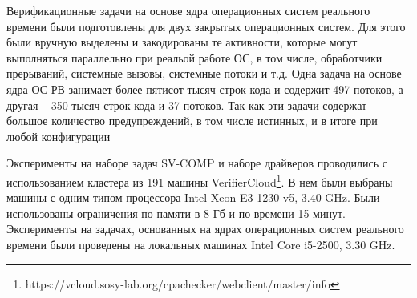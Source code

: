 Верификационные задачи на основе ядра операционных систем реального времени были подготовлены для двух закрытых операционных систем.
Для этого были вручную выделены и закодированы те активности, которые могут выполняться параллельно при реальой работе ОС, в том числе, обработчики прерываний, системные вызовы, системные потоки и т.д.
Одна задача на основе ядра ОС РВ занимает более пятисот тысяч строк кода и содержит 497 потоков, а другая -- 350 тысяч строк кода и 37 потоков.
Так как эти задачи содержат большое количество предупреждений, в том числе истинных, и в итоге при любой конфигурации

Эксперименты на наборе задач SV-COMP и наборе драйверов проводились с использованием кластера из 191 машины VerifierCloud\footnote{https://vcloud.sosy-lab.org/cpachecker/webclient/master/info}.
В нем были выбраны машины с одним типом процессора Intel Xeon E3-1230 v5, 3.40 GHz.
Были использованы ограничения по памяти в 8 Гб и по времени 15 минут.
Эксперименты на задачах, основанных на ядрах операционных систем реального времени были проведены на локальных машинах Intel Core i5-2500, 3.30 GHz.

